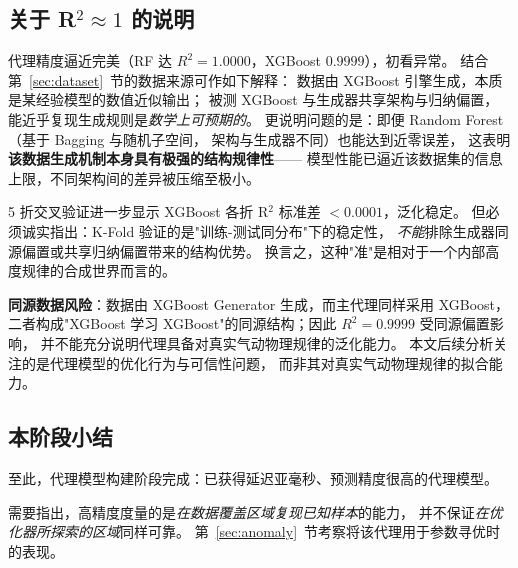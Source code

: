 \subsection{关于 R$^2\approx 1$ 的说明}

代理精度逼近完美（RF 达 $R^2=1.0000$，XGBoost $0.9999$），初看异常。
结合第~\ref{sec:dataset}~节的数据来源可作如下解释：
数据由 XGBoost 引擎生成，本质是某经验模型的数值近似输出；
被测 XGBoost 与生成器共享架构与归纳偏置，能近乎复现生成规则是\emph{数学上可预期的}。
更说明问题的是：即便 Random Forest（基于 Bagging 与随机子空间，
架构与生成器不同）也能达到近零误差，
这表明\textbf{该数据生成机制本身具有极强的结构规律性}——
模型性能已逼近该数据集的信息上限，不同架构间的差异被压缩至极小。

5 折交叉验证进一步显示 XGBoost 各折 R$^2$ 标准差 $<0.0001$，泛化稳定。
但必须诚实指出：K-Fold 验证的是"训练-测试同分布"下的稳定性，
\emph{不能}排除生成器同源偏置或共享归纳偏置带来的结构优势。
换言之，这种"准"是相对于一个内部高度规律的合成世界而言的。

\textbf{同源数据风险}：数据由 XGBoost Generator 生成，而主代理同样采用 XGBoost，
二者构成"XGBoost 学习 XGBoost"的同源结构；因此 $R^2=0.9999$ 受同源偏置影响，
并不能充分说明代理具备对真实气动物理规律的泛化能力。
本文后续分析关注的是代理模型的优化行为与可信性问题，
而非其对真实气动物理规律的拟合能力。

\subsection{本阶段小结}

至此，代理模型构建阶段完成：已获得延迟亚毫秒、预测精度很高的代理模型。

需要指出，高精度度量的是\emph{在数据覆盖区域复现已知样本}的能力，
并不保证\emph{在优化器所探索的区域}同样可靠。
第~\ref{sec:anomaly}~节考察将该代理用于参数寻优时的表现。
